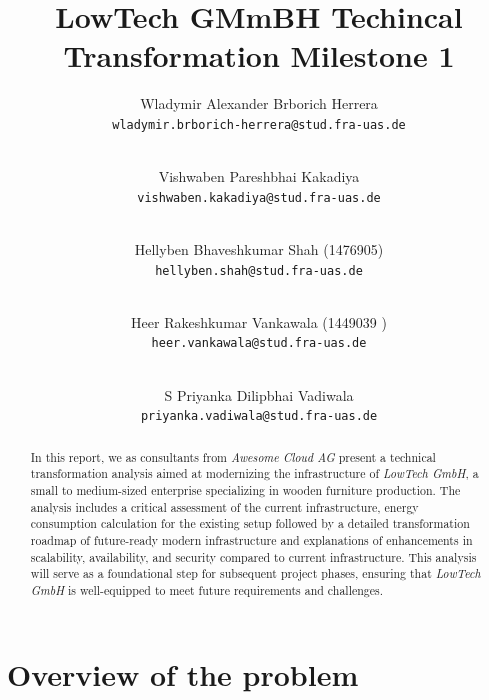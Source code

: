 \documentclass{llncs}
\newcommand{\what}{LowTech GMmBH Techincal Transformation Milestone 1}
\begin{document}
%
%
%
\mainmatter              %
%
\title{\what}
%
\author{
  Wladymir Alexander Brborich Herrera\\
  \texttt{wladymir.brborich-herrera@stud.fra-uas.de}
  \and\\ 
  Vishwaben Pareshbhai Kakadiya\\
  \texttt{vishwaben.kakadiya@stud.fra-uas.de}
  \and\\
  Hellyben Bhaveshkumar Shah (1476905)\\
  \texttt{hellyben.shah@stud.fra-uas.de}
  \and\\
  Heer Rakeshkumar Vankawala (1449039
  )\\
  \texttt{heer.vankawala@stud.fra-uas.de}
  \and\\S
  Priyanka Dilipbhai Vadiwala\\
  \texttt{priyanka.vadiwala@stud.fra-uas.de}
}
%

\maketitle              %

\begin{abstract}
  In this report, we as consultants from \textit{Awesome Cloud AG} present a technical transformation analysis aimed at modernizing the infrastructure of \textit{LowTech GmbH}, 
  a small to medium-sized enterprise specializing in wooden furniture production. 
  The analysis includes a critical assessment of the current infrastructure, energy consumption calculation for the existing setup 
  followed by a detailed transformation roadmap of future-ready modern infrastructure and explanations of enhancements in scalability, availability, and security compared to current infrastructure. 
  This analysis will serve as a foundational step for subsequent project phases, ensuring that \textit{LowTech GmbH} is well-equipped to meet future requirements and challenges.
\end{abstract}

\section{Overview of the problem}
\end{document}
